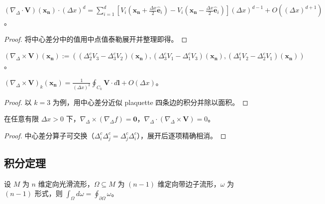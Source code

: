 \begin{proposition}[离散散度的通量解释]\label{prop:discrete_divergence_flux}
$(\nabla_{\Delta}\cdot\mathbf{V})(\mathbf{x}_{\mathbf{n}})\cdot(\Delta x)^d=\sum_{i=1}^d[V_i(\mathbf{x}_{\mathbf{n}}+\tfrac{\Delta x}{2}\hat{\mathbf{e}}_i)-V_i(\mathbf{x}_{\mathbf{n}}-\tfrac{\Delta x}{2}\hat{\mathbf{e}}_i)](\Delta x)^{d-1}+O((\Delta x)^{d+1})$。
\end{proposition}

\begin{proof}
将中心差分中的值用中点值泰勒展开并整理即得。
\end{proof}

\begin{definition}[离散旋度]\label{def:discrete_curl_strict}
$(\nabla_{\Delta}\times\mathbf{V})(\mathbf{x}_{\mathbf{n}}):=((\Delta_2^cV_3-\Delta_3^cV_2)(\mathbf{x}_{\mathbf{n}}),(\Delta_3^cV_1-\Delta_1^cV_3)(\mathbf{x}_{\mathbf{n}}),(\Delta_1^cV_2-\Delta_2^cV_1)(\mathbf{x}_{\mathbf{n}}))$。
\end{definition}

\begin{proposition}[离散旋度的环量解释]\label{prop:discrete_curl_circulation}
$(\nabla_{\Delta}\times\mathbf{V})_k(\mathbf{x}_{\mathbf{n}})=\frac{1}{(\Delta x)^2}\oint_{C_k}\mathbf{V}\cdot d\mathbf{l}+O(\Delta x)$。
\end{proposition}

\begin{proof}
以 $k=3$ 为例，用中心差分近似 plaquette 四条边的积分并除以面积。
\end{proof}

\begin{proposition}[离散恒等式的精确成立]\label{prop:discrete_exact_identities}
在任意有限 $\Delta x>0$ 下，$\nabla_{\Delta}\times(\nabla_{\Delta}f)=\mathbf{0}$，$\nabla_{\Delta}\cdot(\nabla_{\Delta}\times\mathbf{V})=0$。
\end{proposition}

\begin{proof}
中心差分算子可交换（$\Delta_i^c\Delta_j^c=\Delta_j^c\Delta_i^c$），展开后逐项精确相消。
\end{proof}

\subsection{积分定理}

\begin{theorem}\label{thm:stokes_manifold}
设 $M$ 为 $n$ 维定向光滑流形，$\Omega\subseteq M$ 为 $(n-1)$ 维定向带边子流形，$\omega$ 为 $(n-1)$ 形式，则 $\int_\Omega d\omega=\oint_{\partial\Omega}\omega$。
\end{theorem}

